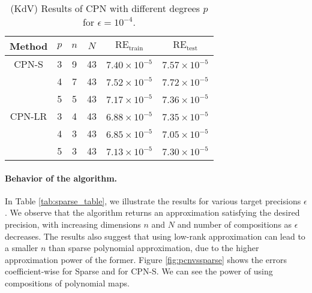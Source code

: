 \begin{table}[h]
\centering %

\begin{tabular}{|c|c|c|c|c|c|}
\hline
{Method} & $p$ & $n$ & $N$ & $ \text{RE}_{\text{train}} $ & $ \text{RE}_{\text{test}} $ \\ 
 \hline
\centering CPN-S & 3  & 9 & 43 & $ 7.40 \times 10^{-5}$  & $ 7.57 \times 10^{-5}$ \\ \cline{2-6}

    & 4 & 7 & 43 & $ 7.52 \times 10^{-5}$ & $ 7.72 \times 10^{-5}$ \\ \cline{2-6}

    & 5 & 5 & 43 & $ 7.17 \times 10^{-5} $ & $ 7.36 \times 10^{-5} $ \\
 \hline
 \centering CPN-LR & 3 & 4 & 43 & $ 6.88 \times 10^{-5}$ & $7.35 \times 10^{-5}$ \\ \cline{2-6}

    & 4 & 3 & 43 & $ 6.85 \times 10^{-5}$ & $ 7.05 \times 10^{-5}$  \\ \cline{2-6}

    & 5 & 3 & 43 & $ 7.13 \times 10^{-5}$ & $ 7.30 \times 10^{-5} $ \\
 \hline
\end{tabular}
\caption{(KdV) Results of CPN with different degrees $ p $ for $ \epsilon = 10^{-4} $.}
\label{tab:different_p}
\end{table}



\paragraph{Behavior of the algorithm.}

In Table  \ref{tab:sparse_table}, we illustrate the results for various target precisions $\epsilon$. We observe that the algorithm returns an approximation satisfying the desired precision, with increasing dimensions $n$ and $N$ and number of compositions as $\epsilon$ decreases.  
The results also suggest that using low-rank approximation can lead to a smaller $ n $ than sparse polynomial approximation, due to the higher approximation power of the former. Figure \ref{fig:pcnvssparse} shows the errors coefficient-wise for Sparse and for CPN-S. We can see the power of using compositions of polynomial maps. 
 
